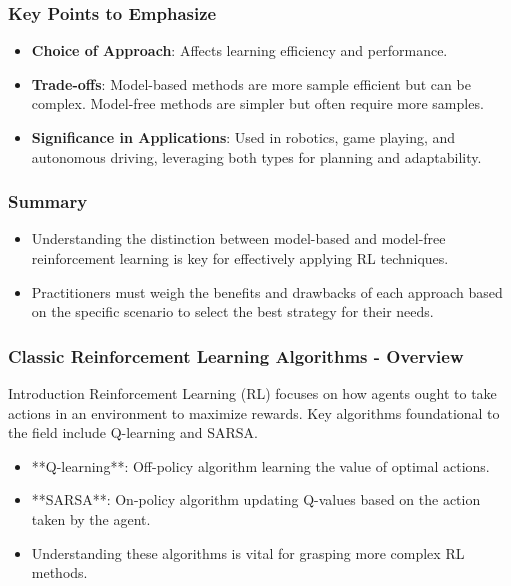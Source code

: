 \documentclass[aspectratio=169]{beamer}
\begin{document}
\begin{frame}[fragile]
    \frametitle{Key Points to Emphasize}
    \begin{itemize}
        \item \textbf{Choice of Approach}: Affects learning efficiency and performance.
        \item \textbf{Trade-offs}: Model-based methods are more sample efficient but can be complex. Model-free methods are simpler but often require more samples.
        \item \textbf{Significance in Applications}: Used in robotics, game playing, and autonomous driving, leveraging both types for planning and adaptability.
    \end{itemize}
\end{frame}

\begin{frame}[fragile]
    \frametitle{Summary}
    \begin{itemize}
        \item Understanding the distinction between model-based and model-free reinforcement learning is key for effectively applying RL techniques.
        \item Practitioners must weigh the benefits and drawbacks of each approach based on the specific scenario to select the best strategy for their needs.
    \end{itemize}
\end{frame}

\begin{frame}[fragile]
    \frametitle{Classic Reinforcement Learning Algorithms - Overview}
    \begin{block}{Introduction}
        Reinforcement Learning (RL) focuses on how agents ought to take actions in an environment to maximize rewards. 
        Key algorithms foundational to the field include Q-learning and SARSA.
    \end{block}
    \begin{itemize}
        \item **Q-learning**: Off-policy algorithm learning the value of optimal actions.
        \item **SARSA**: On-policy algorithm updating Q-values based on the action taken by the agent.
        \item Understanding these algorithms is vital for grasping more complex RL methods.
    \end{itemize}
\end{frame}
\end{document}
